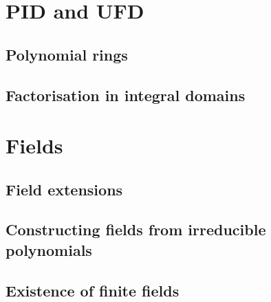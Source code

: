 \documentclass[12pt]{article}
\theoremstyle{definition}
\begin{document}
\section{PID and UFD}

\subsection{Polynomial rings}

\subsection{Factorisation in integral domains}

\section{Fields}

\subsection{Field extensions}

\subsection{Constructing fields from irreducible polynomials}

\subsection{Existence of finite fields}
\end{document}
